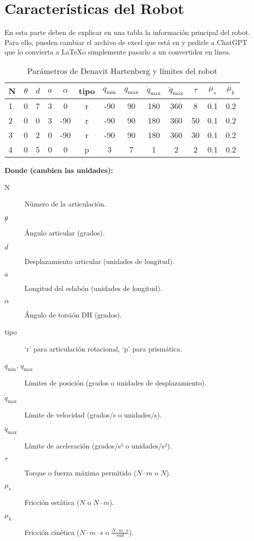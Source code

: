 \section{Características del Robot} \label{sec:caracteristicas_del_robot}

En esta parte deben de explicar en una tabla la información principal del robot. Para ello, pueden cambiar el archivo de excel  que está en  y pedirle a ChatGPT que lo convierta a \LaTeX o simplemente pasarlo a un convertidor en línea.

\begin{table}[ht]
	\centering
	\caption{Parámetros de Denavit Hartenberg y límites del robot}
	\label{tab:parametros_robot}
	\begin{tabular}{ l|cccccccccccc
		}
		\toprule
		N & {$\theta$} & {$d$} & {$a$} & {$\alpha$} & {tipo} 
		& {$q_{\min}$} & {$q_{\max}$} 
		& {$\dot q_{\max}$} & {$\ddot q_{\max}$} 
		& {$\tau$} & {$\mu_s$} & {$\mu_k$} \\
		\midrule
		1 & 0 & 7 & 3  & 0   & r & -90 & 90 & 180 & 360 &  8  & 0.1 & 0.2 \\
		2 & 0 & 0 & 3  & -90 & r & -90 & 90 & 180 & 360 & 50  & 0.1 & 0.2 \\
		3 & 0 & 2 & 0  & -90 & r & -90 & 90 & 180 & 360 & 30  & 0.1 & 0.2 \\
		4 & 0 & 5 & 0  & 0   & p &   3 &  7 &   1 &   2 & 2  & 0.1 & 0.2 \\
		\bottomrule
	\end{tabular}
\end{table}
\bigskip
\noindent
\textbf{Donde (cambien las unidades):}
\begin{description}
	\item[N] Número de la articulación.
	\item[\(\theta\)] Ángulo articular (grados).
	\item[\(d\)] Desplazamiento articular (unidades de longitud).
	\item[\(a\)] Longitud del eslabón (unidades de longitud).
	\item[\(\alpha\)] Ángulo de torsión DH (grados).
	\item[tipo] ‘r’ para articulación rotacional, ‘p’ para prismática.
	\item[\(q_{\min}\), \(q_{\max}\)] Límites de posición (grados o unidades de desplazamiento).
	\item[\(\dot q_{\max}\)] Límite de velocidad (grados/s o unidades/s).
	\item[\(\ddot q_{\max}\)] Límite de aceleración (grados/s² o unidades/s²).
	\item[\(\tau\)] Torque o fuerza máxima permitido (\(N \cdot m\) o \(N\)).
	\item[\(\mu_s\)] Fricción estática (\(N\) o \(N \cdot m\)).
	\item[\(\mu_k\)] Fricción cinética (\(N \cdot m \cdot s\) o \(\frac{N \cdot m \cdot s}{rad}\)).
\end{description}

